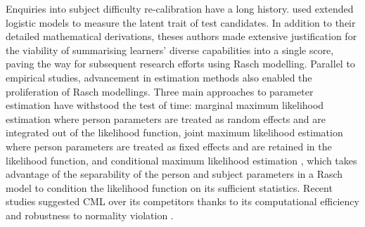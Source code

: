 \documentclass[
    a4paper,            %
    11pt,               %
    stu,                %
    donotrepeattitle,   %
    noextraspace,       %
    floatsintext,       %
    biblatex,           %
    colorlinks=true,        %
    linkcolor=red,          %
    anchorcolor=black,      %
    citecolor=blue,         %
    urlcolor=blue,          %
    bookmarks=true,         %
    bookmarksopen=false,    %
    bookmarksnumbered=true  %
]{apa7}
\begin{document}
Enquiries into subject difficulty re-calibration have a long history. \textcite{tognolini:1996} used extended logistic models to measure the latent trait of test candidates. In addition to their detailed mathematical derivations, theses authors made extensive justification for the viability of summarising learners' diverse capabilities into a single score, paving the way for subsequent research efforts using Rasch modelling. Parallel to empirical studies, advancement in estimation methods also enabled the proliferation of Rasch modellings. Three main approaches to parameter estimation have withstood the test of time: marginal maximum likelihood estimation \parencite[MML, ][]{bock:1981} where person parameters are treated as random effects and are integrated out of the likelihood function, joint maximum likelihood estimation \parencite[JML, ][]{birnbaum:1968, lord:1980, mislevy:1987} where person parameters are treated as fixed effects and are retained in the likelihood function, and conditional maximum likelihood estimation \parencite[CML, ][]{andersen:1972}, which takes advantage of the separability of the person and subject parameters in a Rasch model to condition the likelihood function on its sufficient statistics. Recent studies suggested CML over its competitors thanks to its computational efficiency \parencite{christensen:2013} and robustness to normality violation \parencite{steinfeld:2021}.


\end{document}

